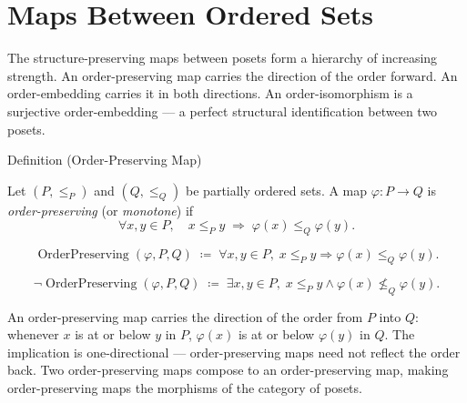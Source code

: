 
\section{Maps Between Ordered Sets}
\label{sec:maps-ordered-sets}

\begin{remark*}
The structure-preserving maps between posets form a hierarchy of increasing
strength.  An order-preserving map carries the direction of the order
forward.  An order-embedding carries it in both directions.  An
order-isomorphism is a surjective order-embedding — a perfect structural
identification between two posets.
\end{remark*}


\begin{definitionbox}{Definition (Order-Preserving Map)}
\begin{definition}
\label{def:order-preserving-map}
Let $(P, \leq_P)$ and $(Q, \leq_Q)$ be partially ordered sets.  A map
$\varphi : P \to Q$ is \emph{order-preserving} (or \emph{monotone}) if
\[
\forall x, y \in P, \quad
x \leq_P y \;\Longrightarrow\; \varphi(x) \leq_Q \varphi(y).
\]
\end{definition}
\end{definitionbox}

\begin{remark*}
\[
\operatorname{OrderPreserving}(\varphi, P, Q)
\;\coloneqq\;
\forall x, y \in P,\;
x \leq_P y \Rightarrow \varphi(x) \leq_Q \varphi(y).
\]
\end{remark*}

\begin{remark*}
\[
\neg\operatorname{OrderPreserving}(\varphi, P, Q)
\;\coloneqq\;
\exists x, y \in P,\;
x \leq_P y \land \varphi(x) \not\leq_Q \varphi(y).
\]
\end{remark*}

\begin{remark*}[Interpretation]
An order-preserving map carries the direction of the order from $P$ into
$Q$: whenever $x$ is at or below $y$ in $P$, $\varphi(x)$ is at or below
$\varphi(y)$ in $Q$.  The implication is one-directional — order-preserving
maps need not reflect the order back.  Two order-preserving maps compose
to an order-preserving map, making order-preserving maps the morphisms
of the category of posets.
\end{remark*}

